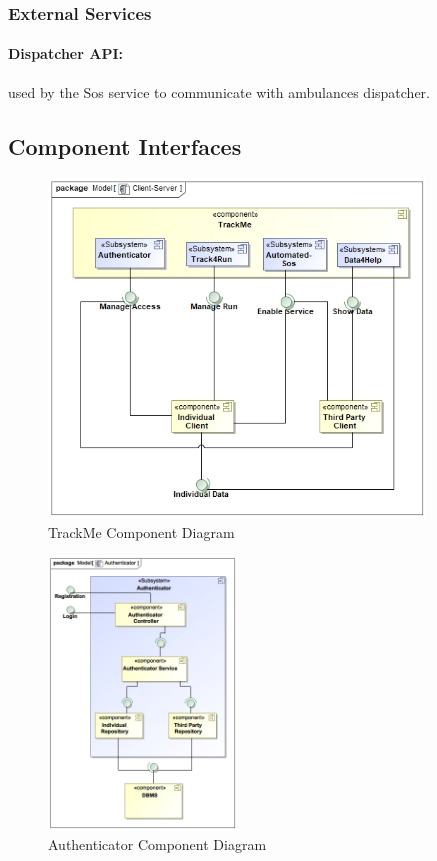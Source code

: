\documentclass[a4paper]{article}
\begin{document}
    \subsubsection{External Services}
    \paragraph{Dispatcher API:}
    used by the Sos service to communicate with ambulances dispatcher.

\newpage
\subsection{Component Interfaces}
\begin{figure}[!htpb]
    \centering
    \includegraphics[width=100mm,keepaspectratio]{images/UML/component_TrackMe.jpg}
    \caption{TrackMe Component Diagram}
    \label{fig:component_trackme}
\end{figure}
\begin{figure}[!htpb]
    \centering
    \includegraphics[width=50mm,keepaspectratio]{DD/images/UML/component_Authenticator.jpg}
    \caption{Authenticator Component Diagram}
    \label{fig:component_authenticator}
\end{figure}
\end{document}
